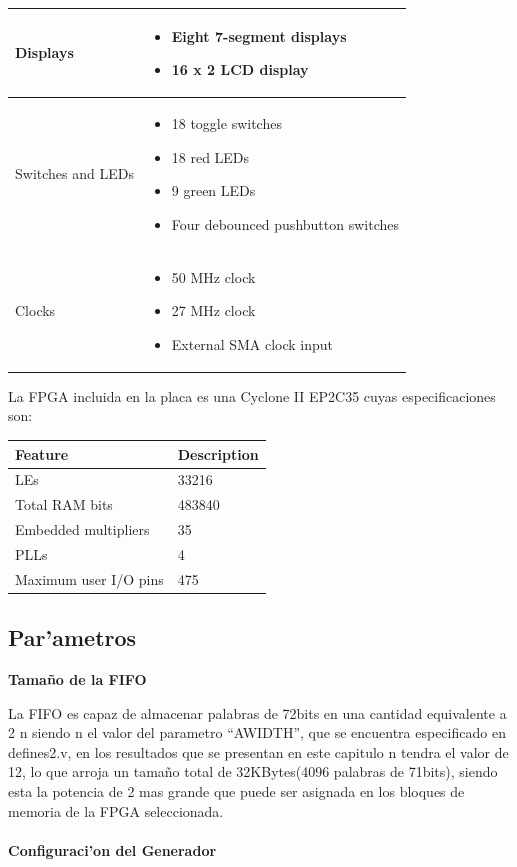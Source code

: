 \documentclass[12pt,spanish]{article}
\begin{document}
\begin{center}
\begin{longtable}{|l|p{4.75in}|}
		Displays & \begin{itemize}
					\item Eight 7-segment displays
    					\item 16 x 2 LCD display
    			 \end{itemize} \\ \hline
		Switches and LEDs & \begin{itemize}
					\item 18 toggle switches
    					\item 18 red LEDs
   					\item 9 green LEDs
   					\item Four debounced pushbutton switches
   				     \end{itemize} \\ \hline
		Clocks & \begin{itemize}
					\item 50 MHz clock
    					\item 27 MHz clock
   					\item External SMA clock input
   			 \end{itemize}	 \\ \hline
	\end{longtable} 
\end{center}

La FPGA incluida en la placa es una Cyclone II EP2C35 cuyas especificaciones son:

\begin{center}
	\begin{longtable}{|l|p{1.75in}|} \hline
		\textbf{Feature} & \textbf{Description} \\ \hline
		LEs & 33216 \\ \hline
		Total RAM bits & 483840 \\ \hline
		Embedded multipliers & 35 \\ \hline
		PLLs & 4 \\ \hline
		Maximum user I/O pins & 475 \\ \hline
	\end{longtable}
\end{center}
		
\subsection*{Par'ametros}
\textbf{Tama\~no de la FIFO}

La FIFO es capaz de almacenar palabras de 72bits en una cantidad equivalente a 2 n  siendo n  el valor del parametro “AWIDTH”, 
que se encuentra especificado en defines2.v,  en los resultados que se presentan en este capitulo n tendra el valor de 12, lo que
 arroja un tama\~no total de 32KBytes(4096 palabras de 71bits), siendo esta la potencia de 2 mas grande que puede ser asignada en los
 bloques de memoria de la FPGA seleccionada.
\\
\\
\textbf{Configuraci'on del Generador}
\end{document}
